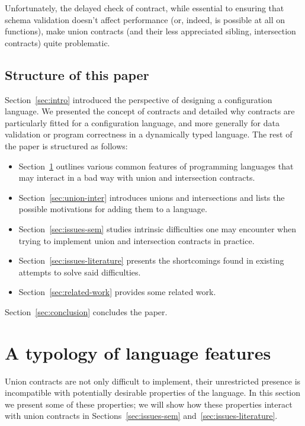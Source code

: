 \documentclass[sigplan,10pt,review,anonymous]{acmart}
\newcommand{\unsure}[2][1=]{}
\newcommand{\info}[2][1=]{}
\begin{document}
Unfortunately, the delayed check of contract, while essential to
ensuring that schema validation doesn't affect performance (or, indeed,
is possible at all on functions), make union contracts (and their less
appreciated sibling, intersection contracts) quite problematic.

\subsection{Structure of this paper}
\unsure{Make this section into a contributions section?}
Section~\ref{sec:intro} introduced the perspective of designing a configuration
language. We presented the concept of contracts and detailed why contracts are
particularly fitted for a configuration language, and more generally for data
validation or program correctness in a dynamically typed language. The rest of
the paper is structured as follows:
\begin{itemize}
    \item Section~\ref{sec:feat-lang} outlines various common features of
        programming languages that may interact in a bad way with union and
        intersection contracts.
    \item Section~\ref{sec:union-inter} introduces unions and intersections and
        lists the possible motivations for adding them to a language.
    \item Section~\ref{sec:issues-sem} studies intrinsic difficulties one may
        encounter when trying to implement union and intersection contracts in
        practice.
    \item Section~\ref{sec:issues-literature} presents the shortcomings found in
        existing attempts to solve said difficulties.
    \item Section~\ref{sec:related-work} provides some related work.
\end{itemize}

Section~\ref{sec:conclusion} concludes the paper.


\section{A typology of language features}
\label{sec:feat-lang}
\info{Zoology of various features that we will eventually show
  conflict with this or that property or implementation of union and
  intersection. Including user-define contracts.}

Union contracts are not only difficult to implement, their
unrestricted presence is incompatible with potentially desirable
properties of the language. In this section we present some of these
properties; we will show how these properties interact with union
contracts in Sections~\ref{sec:issues-sem}
and~\ref{sec:issues-literature}.
\end{document}
